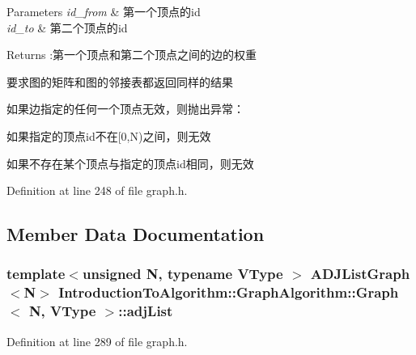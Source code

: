 \begin{DoxyParams}{Parameters}
{\em id\+\_\+from} & 第一个顶点的{\ttfamily id} \\
\hline
{\em id\+\_\+to} & 第二个顶点的{\ttfamily id} \\
\hline
\end{DoxyParams}
\begin{DoxyReturn}{Returns}
\+:第一个顶点和第二个顶点之间的边的权重
\end{DoxyReturn}
要求图的矩阵和图的邻接表都返回同样的结果

如果边指定的任何一个顶点无效，则抛出异常：


\begin{DoxyItemize}
\item 如果指定的顶点{\ttfamily id}不在{\ttfamily \mbox{[}0,N)}之间，则无效
\item 如果不存在某个顶点与指定的顶点{\ttfamily id}相同，则无效 
\end{DoxyItemize}

Definition at line 248 of file graph.\+h.



\subsection{Member Data Documentation}
\hypertarget{struct_introduction_to_algorithm_1_1_graph_algorithm_1_1_graph_a4442db9dd1bbb7fe543353df4fa1ba9f}{}
\subsubsection[{adj\+List}]{\setlength{\rightskip}{0pt plus 5cm}template$<$unsigned N, typename V\+Type $>$ {\bf A\+D\+J\+List\+Graph}$<$N$>$ {\bf Introduction\+To\+Algorithm\+::\+Graph\+Algorithm\+::\+Graph}$<$ N, V\+Type $>$\+::adj\+List}\label{struct_introduction_to_algorithm_1_1_graph_algorithm_1_1_graph_a4442db9dd1bbb7fe543353df4fa1ba9f}


Definition at line 289 of file graph.\+h.

\hypertarget{struct_introduction_to_algorithm_1_1_graph_algorithm_1_1_graph_a498323460ec613f12e1039afdca6c10a}{}
